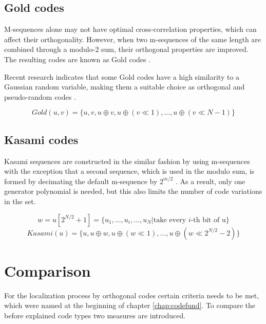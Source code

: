 
\subsection{Gold codes}
M-sequences alone may not have optimal cross-correlation properties, which can affect their orthogonality. However, when two m-sequences of the same length are combined through a modulo-2 sum, their orthogonal properties are improved. The resulting codes are known as Gold codes \cite{proakis08}.

Recent research indicates that some Gold codes have a high similarity to a Gaussian random variable, making them a suitable choice as orthogonal and pseudo-random codes \cite{merrifield}. 

\begin{equation}
Gold(u,v)=\{u,v,u\oplus v,u\oplus(v \ll1),\dots,u\oplus(v\ll N-1)\}
\end{equation}

\subsection{Kasami codes}

Kasami sequences are constructed in the similar fashion by using m-sequences with the exception that a second sequence, which is used in the modulo sum, is formed by decimating the default m-sequence by  $2^{m/2}$ \cite{proakis08} \cite{sarwate80} \cite{peterson72}. As a result, only one generator polynomial is needed, but this also limits the number of code variations in the set.

\begin{equation}
w=u[2^{N/2}+1]=\{u_1,\dots, u_i, \dots,u_{N}|\text{take every }i\text{-th bit of u}\} 
\end{equation}
\begin{equation}
Kasami(u)=\{u,u\oplus w,u\oplus(w \ll1),\dots,u\oplus(w\ll2^{N/2}-2)\}
\end{equation}
\section{Comparison}
For the localization process by orthogonal codes certain criteria needs to be met, which were named at the beginning of chapter \ref{chap:codefund}. To compare the before explained code types two measures are introduced.

